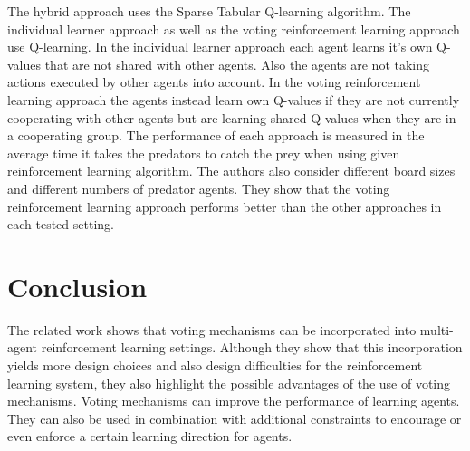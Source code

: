 \documentclass[conference]{IEEEtran}
\begin{document}
The hybrid approach uses the Sparse Tabular Q-learning algorithm.
The individual learner approach as well as the voting reinforcement learning approach use Q-learning.
In the individual learner approach each agent learns it's own Q-values that are not shared with other agents. Also the agents are not taking actions executed by other agents into account.
In the voting reinforcement learning approach the agents instead learn own Q-values if they are not currently cooperating with other agents but are learning shared Q-values when they are in a cooperating group.
The performance of each approach is measured in the average time it takes the predators to catch the prey when using given reinforcement learning algorithm.
The authors also consider different board sizes and different numbers of predator agents. They show that the voting reinforcement learning approach performs better than the other approaches in each tested setting.

\section{Conclusion}\label{4Conclusion}
The related work shows that voting mechanisms can be incorporated into multi-agent reinforcement learning settings. Although they show that this incorporation yields more design choices and also design difficulties for the reinforcement learning system, they also highlight the possible advantages of the use of voting mechanisms. Voting mechanisms can improve the performance of learning agents. They can also be used in combination with additional constraints to encourage or even enforce a certain learning direction for agents.




\vspace{12pt}
\end{document}
